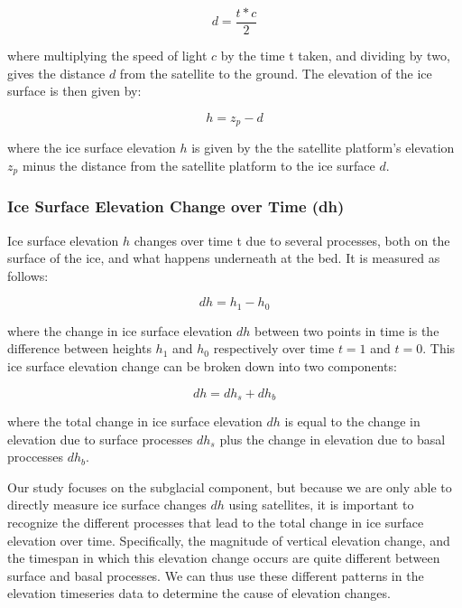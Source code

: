 \begin{equation}\label{eq:4.4}
  d = \frac{t * c}{2}
\end{equation}

where multiplying the speed of light $c$ by the time \gls{t} taken, and dividing by two, gives the distance $d$ from the satellite to the ground.
The elevation of the ice surface is then given by:

\begin{equation}\label{eq:4.5}
  h = z_p - d
\end{equation}

where the ice surface elevation $h$ is given by the the satellite platform's elevation $z_p$ minus the distance from the satellite platform to the ice surface $d$.


\subsubsection{Ice Surface Elevation Change over Time (dh)}

Ice surface elevation $h$ changes over time \gls{t} due to several processes, both on the surface of the ice, and what happens underneath at the bed.
It is measured as follows:

\begin{equation}\label{eq:4.6}
  dh = h_1 - h_0
\end{equation}

where the change in ice surface elevation $dh$ between two points in time is the difference between heights $h_1$ and $h_0$ respectively over time $t=1$ and $t=0$.
This ice surface elevation change can be broken down into two components:

\begin{equation}\label{eq:4.7}
  dh = dh_s + dh_b
\end{equation}

where the total change in ice surface elevation $dh$ is equal to the change in elevation due to surface processes $dh_s$ plus the change in elevation due to basal proccesses $dh_b$.

Our study focuses on the subglacial component, but because we are only able to directly measure ice surface changes $dh$ using satellites, it is important to recognize the different processes that lead to the total change in ice surface elevation over time.
Specifically, the magnitude of vertical elevation change, and the timespan in which this elevation change occurs are quite different between surface and basal processes.
We can thus use these different patterns in the elevation timeseries data to determine the cause of elevation changes.


